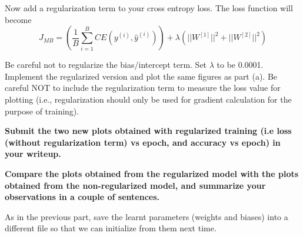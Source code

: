 \item {} Now add a regularization term to your cross entropy loss.
The loss function will become \begin{equation*}
  J_{MB} = \left(\frac{1}{B}\sum_{i=1}^{B}CE(y^{(i)}, \hat{y}^{(i)})\right) + \lambda \left(||W^{[1]}||^2 + ||W^{[2]}||^2 \right)
  \end{equation*}

Be careful not to regularize the bias/intercept term.
Set $\lambda$ to be 0.0001. Implement the regularized version and plot the same
figures as part (a). Be careful NOT to include the regularization term to measure
the loss value for plotting (i.e., regularization should only be used for gradient calculation for
the purpose of training).

\textbf{Submit the two new plots obtained with regularized training (i.e loss (without regularization term) vs epoch, and accuracy vs epoch) in your writeup.}

\textbf{Compare the plots obtained from the regularized model with the plots obtained
from the non-regularized model, and summarize your observations in a couple of sentences.}

As in the previous part, save the learnt parameters (weights and biases) into a
different file so that we can initialize from them next time.

